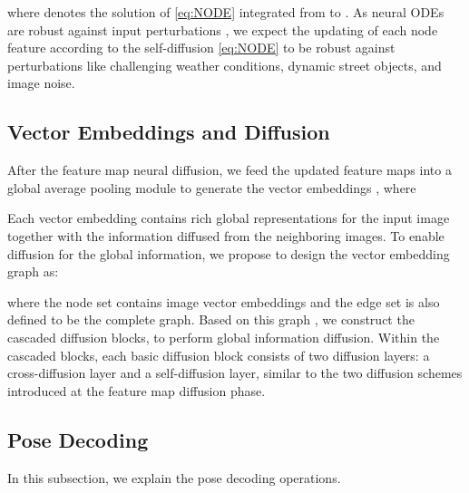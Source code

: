 \documentclass[letterpaper]{article} \usepackage{aaai23}  \usepackage{times}  \usepackage{helvet}  \usepackage{courier}  \usepackage[hyphens]{url}  \usepackage{graphicx} \urlstyle{rm} \def\UrlFont{\rm}  \usepackage{natbib}  \usepackage{caption} \frenchspacing  \setlength{\pdfpagewidth}{8.5in} \setlength{\pdfpageheight}{11in} \usepackage{booktabs}
\theoremstyle{remark}
\theoremstyle{plain}
\begin{document}
where  denotes the solution of \cref{eq:NODE} integrated from  to . 
As neural ODEs are robust against input perturbations  \cite{yan2019robustness,kang2021Neurips}, we expect the updating of each node feature according to the self-diffusion \cref{eq:NODE} to be robust against perturbations like challenging weather conditions, dynamic street objects, and image noise.





































\subsection{Vector Embeddings and Diffusion}
After the feature map neural diffusion, we feed the updated feature maps into a global average pooling module to generate the vector embeddings , where

Each vector embedding contains rich global representations for the input image together with the information diffused from the neighboring images. To enable diffusion for the global information, we propose to design the vector embedding graph as:

where the node set  contains image vector embeddings  and the edge set  is also defined to be the complete graph. Based on this graph , we construct the cascaded diffusion blocks, to perform global information diffusion. Within the cascaded blocks, each basic diffusion block consists of two diffusion layers: a cross-diffusion layer and a self-diffusion layer, similar to the two diffusion schemes introduced at the feature map diffusion phase.

\subsection{Pose Decoding}
In this subsection, we explain the pose decoding operations.
\end{document}
